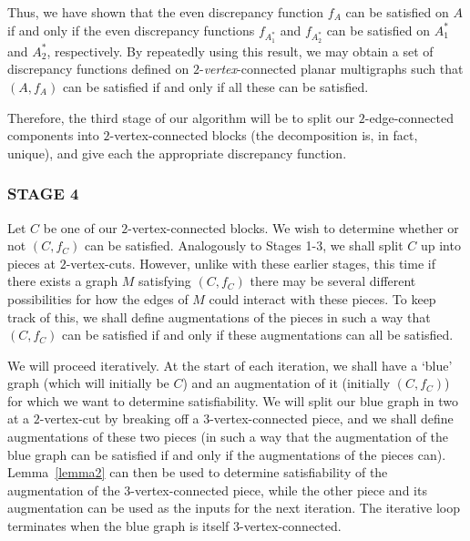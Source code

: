 \documentclass{article}
\newtheorem{Proof of Theorem}{Proof of Theorem}
\begin{document}
Thus, we have shown that the even discrepancy function $f_{A}$ can be satisfied on $A$ if and only if
the even discrepancy functions $f_{A_{1}^{*}}$ and $f_{A_{2}^{*}}$ 
can be satisfied on $A_{1}^{*}$ and $A_{2}^{*}$, respectively.
By repeatedly using this result, 
we may obtain a set of discrepancy functions 
defined on $2$-\textit{vertex}-connected planar multigraphs
such that $(A,f_{A})$ can be satisfied if and only if all these can be satisfied.

Therefore, the third stage of our algorithm will be to split our $2$-edge-connected components 
into $2$-vertex-connected blocks
(the decomposition is, in fact, unique),
and give each the appropriate discrepancy function. 





\subsubsection*{STAGE 4} 





Let $C$ be one of our $2$-vertex-connected blocks.
We wish to determine whether or not $(C,f_{C})$ can be satisfied. 
Analogously to Stages 1-3,
we shall split $C$ up into pieces at $2$-vertex-cuts.
However, unlike with these earlier stages,
this time if there exists a graph $M$ satisfying $(C,f_{C})$ 
there may be several different possibilities for how the edges of $M$ could interact with these pieces.
To keep track of this,
we shall define augmentations of the pieces
in such a way that $(C,f_{C})$ can be satisfied if and only if these augmentations can all be satisfied.

We will proceed iteratively.
At the start of each iteration,
we shall have a `blue' graph
(which will initially be $C$)
and an augmentation of it
(initially $(C,f_{C})$)
for which we want to determine satisfiability.
We will split our blue graph in two at a $2$-vertex-cut by breaking off a $3$-vertex-connected piece,
and we shall define augmentations of these two pieces
(in such a way that the augmentation of the blue graph can be satisfied if and only if
the augmentations of the pieces can).
Lemma~\ref{lemma2} can then be used to determine satisfiability of the augmentation of the $3$-vertex-connected piece,
while the other piece and its augmentation can be used as the inputs for the next iteration.
The iterative loop terminates when the blue graph is itself $3$-vertex-connected.
\end{document}
